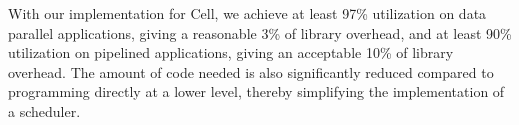 With our implementation for Cell, we achieve at least 97\% utilization
on data parallel applications, giving a reasonable 3\% of library
overhead, and at least 90\% utilization on pipelined applications,
giving an acceptable 10\% of library overhead. The amount of code
needed is also significantly reduced compared to programming directly
at a lower level, thereby simplifying the implementation of a
scheduler.

